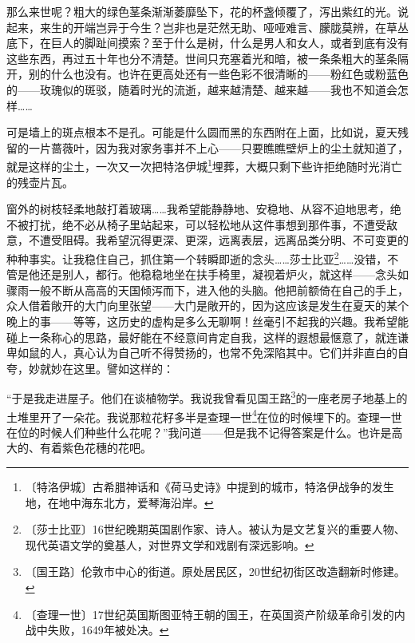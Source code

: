 \documentclass[12pt,UTF-8,openany]{ctexbook}
\begin{document}
\begin{normalsize}
    那么来世呢？粗大的绿色茎条渐渐萎靡坠下，花的杯盏倾覆了，泻出紫红的光。说起来，来生的开端岂异于今生？岂非也是茫然无助、哑哑难言、朦胧莫辨，在草丛底下，在巨人的脚趾间摸索？至于什么是树，什么是男人和女人，或者到底有没有这些东西，再过五十年也分不清楚。世间只充塞着光和暗，被一条条粗大的茎条隔开，别的什么也没有。也许在更高处还有一些色彩不很清晰的——粉红色或粉蓝色的——玫瑰似的斑驳，随着时光的流逝，越来越清楚、越来越——我也不知道会怎样……
    
    可是墙上的斑点根本不是孔。可能是什么圆而黑的东西附在上面，比如说，夏天残留的一片蔷薇叶，因为我对家务事并不上心——只要瞧瞧壁炉上的尘土就知道了，就是这样的尘土，一次又一次把特洛伊城\footnote{〔特洛伊城〕古希腊神话和《荷马史诗》中提到的城市，特洛伊战争的发生地，在地中海东北方，爱琴海沿岸。}埋葬，大概只剩下些许拒绝随时光消亡的残壶片瓦。
    
    窗外的树枝轻柔地敲打着玻璃……我希望能静静地、安稳地、从容不迫地思考，绝不被打扰，绝不必从椅子里站起来，可以轻松地从这件事想到那件事，不遭受敌意，不遭受阻碍。我希望沉得更深、更深，远离表层，远离品类分明、不可变更的种种事实。让我稳住自己，抓住第一个转瞬即逝的念头……莎士比亚\footnote{〔莎士比亚〕16世纪晚期英国剧作家、诗人。被认为是文艺复兴的重要人物、现代英语文学的奠基人，对世界文学和戏剧有深远影响。}……没错，不管是他还是别人，都行。他稳稳地坐在扶手椅里，凝视着炉火，就这样——念头如骤雨一般不断从高高的天国倾泻而下，进入他的头脑。他把前额倚在自己的手上，众人借着敞开的大门向里张望——大门是敞开的，因为这应该是发生在夏天的某个晚上的事——等等，这历史的虚构是多么无聊啊！丝毫引不起我的兴趣。我希望能碰上一条称心的思路，最好能在不经意间肯定自我，这样的遐想最惬意了，就连谦卑如鼠的人，真心认为自己听不得赞扬的，也常不免深陷其中。它们并非直白的自夸，妙就妙在这里。譬如这样的：
    
    “于是我走进屋子。他们在谈植物学。我说我曾看见国王路\footnote{〔国王路〕伦敦市中心的街道。原处居民区，20世纪初街区改造翻新时修建。}的一座老房子地基上的土堆里开了一朵花。我说那粒花籽多半是查理一世\footnote{〔查理一世〕17世纪英国斯图亚特王朝的国王，在英国资产阶级革命引发的内战中失败，1649年被处决。}在位的时候埋下的。查理一世在位的时候人们种些什么花呢？”我问道——但是我不记得答案是什么。也许是高大的、有着紫色花穗的花吧。
    

\end{normalsize}
\end{document}
